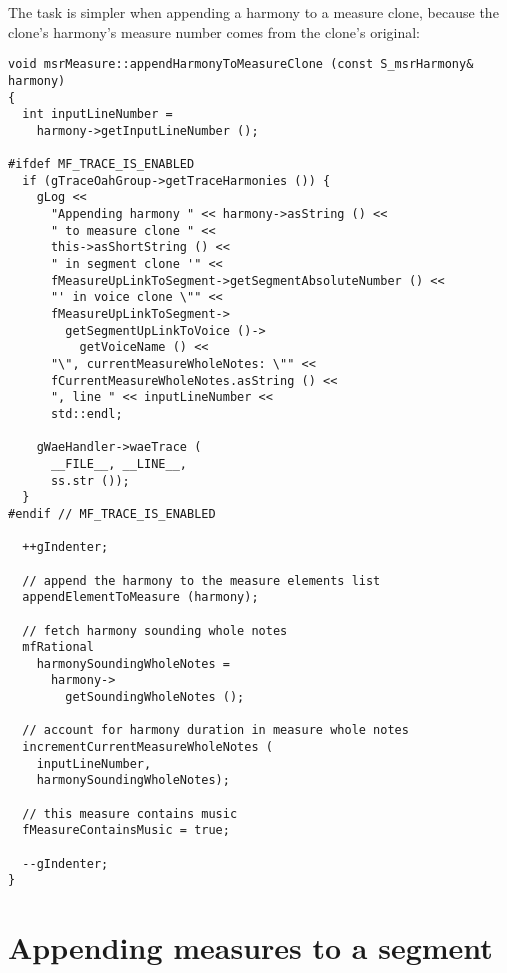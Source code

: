 The task is simpler when appending a harmony to a measure clone, because the clone's harmony's measure number comes from the clone's original:
\begin{lstlisting}[language=CPlusPlus]
void msrMeasure::appendHarmonyToMeasureClone (const S_msrHarmony& harmony)
{
  int inputLineNumber =
    harmony->getInputLineNumber ();

#ifdef MF_TRACE_IS_ENABLED
  if (gTraceOahGroup->getTraceHarmonies ()) {
    gLog <<
      "Appending harmony " << harmony->asString () <<
      " to measure clone " <<
      this->asShortString () <<
      " in segment clone '" <<
      fMeasureUpLinkToSegment->getSegmentAbsoluteNumber () <<
      "' in voice clone \"" <<
      fMeasureUpLinkToSegment->
        getSegmentUpLinkToVoice ()->
          getVoiceName () <<
      "\", currentMeasureWholeNotes: \"" <<
      fCurrentMeasureWholeNotes.asString () <<
      ", line " << inputLineNumber <<
      std::endl;

    gWaeHandler->waeTrace (
      __FILE__, __LINE__,
      ss.str ());
  }
#endif // MF_TRACE_IS_ENABLED

  ++gIndenter;

  // append the harmony to the measure elements list
  appendElementToMeasure (harmony);

  // fetch harmony sounding whole notes
  mfRational
    harmonySoundingWholeNotes =
      harmony->
        getSoundingWholeNotes ();

  // account for harmony duration in measure whole notes
  incrementCurrentMeasureWholeNotes (
    inputLineNumber,
    harmonySoundingWholeNotes);

  // this measure contains music
  fMeasureContainsMusic = true;

  --gIndenter;
}
\end{lstlisting}


\section{Appending measures to a segment}

